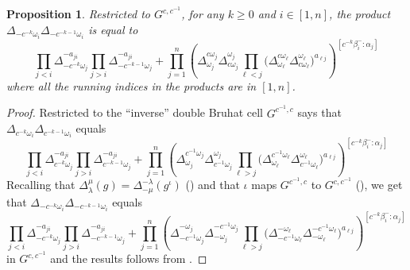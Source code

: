 \documentclass[12pt]{amsart}
\newtheorem{proposition}[theorem]{Proposition}
\numberwithin{equation}{section}
\begin{document}
\begin{proposition}
  Restricted to $G^{c,c^{-1}}$, for any $k\geq 0$ and $i\in[1,n]$, the product $\Delta_{-c^{-k}\omega_i}\Delta_{-c^{-k-1}\omega_i}$ is equal to
  \begin{equation} 
    \prod_{j<i}\Delta_{-c^{-k}\omega_j}^{-a_{ji}}
    \prod_{j>i}\Delta_{-c^{-k-1}\omega_j}^{-a_{ji}}
    +
    \prod_{j=1}^n\left( 
      \Delta^{c \omega_j}_{\omega_j}
      \Delta^{\omega_j}_{ c\omega_j} 
      \prod_{\ell<j}\big(
        \Delta^{c \omega_\ell}_{\omega_\ell} 
        \Delta^{\omega_\ell}_{c \omega_\ell}
      \big)^{a_{\ell j}}
    \right)^{[c^{-k}\beta_i^-:\alpha_j]}
  \end{equation}
  where all the running indices in the products are in $[1,n]$.
\end{proposition}
\begin{proof}
  Restricted to the ``inverse'' double Bruhat cell $G^{c^{-1},c}$  says that $\Delta_{c^{-k}\omega_i} \Delta_{c^{-k-1}\omega_i}$ equals
  \[
    \prod_{j<i}\Delta_{c^{-k}\omega_j}^{-a_{ji}}
    \prod_{j>i}\Delta_{c^{-k-1}\omega_j}^{-a_{ji}}
    +
    \prod_{j=1}^n\left( 
      \Delta^{c^{-1} \omega_j}_{\omega_j}
      \Delta^{\omega_j}_{ c^{-1}\omega_j} 
      \prod_{\ell>j}\big(
        \Delta^{c^{-1} \omega_\ell}_{\omega_\ell} 
        \Delta^{\omega_\ell}_{c^{-1} \omega_\ell}
      \big)^{a_{\ell j}}
    \right)^{[c^{-k}\beta_i^-:\alpha_j]}
  \]
  Recalling that $\Delta_\lambda^\mu(g)=\Delta_{-\mu}^{-\lambda}(g^\iota)$ (\cite[(2.25)]{FZ99}) and that $\iota$ maps $G^{c^{-1},c}$ to $G^{c,c^{-1}}$ (), we get that $\Delta_{-c^{-k}\omega_i} \Delta_{-c^{-k-1}\omega_i}$ equals
  \[
    \prod_{j<i}\Delta_{-c^{-k}\omega_j}^{-a_{ji}}
    \prod_{j>i}\Delta_{-c^{-k-1}\omega_j}^{-a_{ji}}
    +
    \prod_{j=1}^n\left( 
      \Delta^{-\omega_j}_{-c^{-1}\omega_j} 
      \Delta^{-c^{-1} \omega_j}_{-\omega_j}
      \prod_{\ell>j}\big(
        \Delta^{-\omega_\ell}_{-c^{-1}\omega_\ell}
        \Delta^{-c^{-1} \omega_\ell}_{-\omega_\ell} 
      \big)^{a_{\ell j}}
    \right)^{[c^{-k}\beta_i^-:\alpha_j]}
  \]
  in $G^{c,c^{-1}}$ and the results follows from .
\end{proof}
\end{document}
